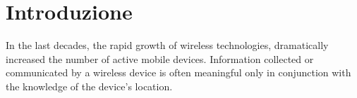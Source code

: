 \chapter*{Introduzione}
\label{chap:Introduction}
In the last decades, the rapid growth of wireless technologies, dramatically increased the number of 
active mobile devices. Information collected or communicated by a wireless device is often meaningful 
only in conjunction with the knowledge of the device's location.



%
%


